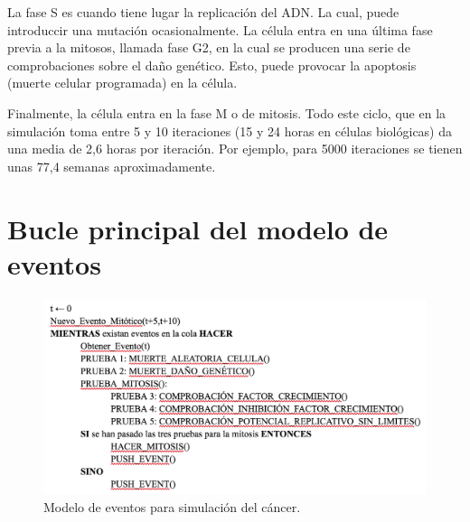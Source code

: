 La fase S es cuando tiene lugar la replicación del ADN. La cual, puede introduccir una mutación ocasionalmente.
La célula entra en una última fase previa a la mitosos, llamada fase G2, en la cual se producen una serie
de comprobaciones sobre el daño genético. Esto, puede provocar la apoptosis (muerte celular programada) en la célula.

Finalmente, la célula entra en la fase M o de mitosis. Todo este ciclo, que en la simulación toma entre 5 y 10 iteraciones
(15 y 24 horas en células biológicas) da una media de 2,6 horas por iteración. Por ejemplo, para 5000 iteraciones se tienen
unas 77,4 semanas aproximadamente.

\section{Bucle principal del modelo de eventos}

\begin{figure}[h]
\centering
\includegraphics[scale=0.8]{figures/pseudo_alg}
\caption{Modelo de eventos para simulación del cáncer.}
\end{figure}
